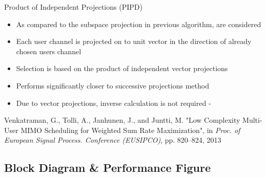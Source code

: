 \documentclass[11pt]{beamer}
\begin{document}
\begin{frame}{Product of Independent Projections (PIPD)\eqn{^\dagger}}
	\begin{itemize}
	\item As compared to the subspace projection in previous algorithm,  are considered
	\item Each user channel is projected on to unit vector in the direction of already chosen users channel
	\item Selection is based on the product of independent vector projections
	\item Performs significantly closer to successive projections method
	\item Due to vector projections, inverse calculation is not required - 
	\end{itemize}
\eqn{^\dagger}\scriptsize{Venkatraman, G., Tolli, A., Janhunen, J., and Juntti, M. "Low Complexity Multi-User MIMO Scheduling for Weighted Sum Rate Maximization", in \emph{Proc. of European Signal Process. Conference (EUSIPCO)}, pp. 820--824, 2013}
\end{frame}

\subsection{Block Diagram \& Performance Figure}
\end{document}
